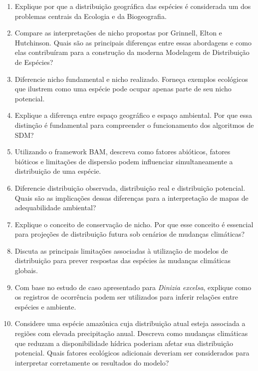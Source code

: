 \begin{exercicios}
	
	\begin{enumerate}
		
		\item Explique por que a distribuição geográfica das espécies é considerada um dos problemas centrais da Ecologia e da Biogeografia.
		
		\item Compare as interpretações de nicho propostas por Grinnell, Elton e Hutchinson. Quais são as principais diferenças entre essas abordagens e como elas contribuíram para a construção da moderna Modelagem de Distribuição de Espécies?
		
		\item Diferencie nicho fundamental e nicho realizado. Forneça exemplos ecológicos que ilustrem como uma espécie pode ocupar apenas parte de seu nicho potencial.
		
		\item Explique a diferença entre espaço geográfico e espaço ambiental. Por que essa distinção é fundamental para compreender o funcionamento dos algoritmos de SDM?
		
		\item Utilizando o framework BAM, descreva como fatores abióticos, fatores bióticos e limitações de dispersão podem influenciar simultaneamente a distribuição de uma espécie.
		
		\item Diferencie distribuição observada, distribuição real e distribuição potencial. Quais são as implicações dessas diferenças para a interpretação de mapas de adequabilidade ambiental?
		
		\item Explique o conceito de conservação de nicho. Por que esse conceito é essencial para projeções de distribuição futura sob cenários de mudanças climáticas?
		
		\item Discuta as principais limitações associadas à utilização de modelos de distribuição para prever respostas das espécies às mudanças climáticas globais.
		
		\item Com base no estudo de caso apresentado para \textit{Dinizia excelsa}, explique como os registros de ocorrência podem ser utilizados para inferir relações entre espécies e ambiente.
		
		\item Considere uma espécie amazônica cuja distribuição atual esteja associada a regiões com elevada precipitação anual. Descreva como mudanças climáticas que reduzam a disponibilidade hídrica poderiam afetar sua distribuição potencial. Quais fatores ecológicos adicionais deveriam ser considerados para interpretar corretamente os resultados do modelo?
		
	\end{enumerate}
	
\end{exercicios}
